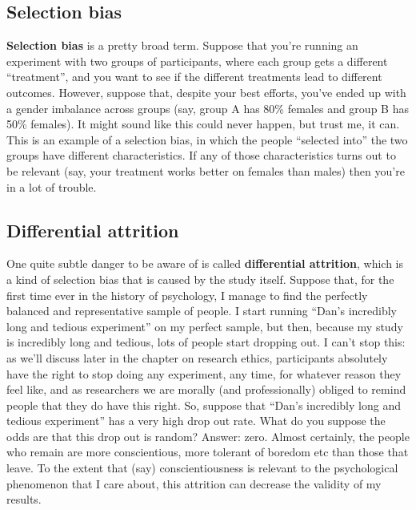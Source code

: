\documentclass[
]{book}
\begin{document}
\hypertarget{selection-bias}{%
\subsection{Selection bias}\label{selection-bias}}

\textbf{Selection bias} is a pretty broad term. Suppose that you're running an experiment with two groups of participants, where each group gets a different ``treatment'', and you want to see if the different treatments lead to different outcomes. However, suppose that, despite your best efforts, you've ended up with a gender imbalance across groups (say, group A has 80\% females and group B has 50\% females). It might sound like this could never happen, but trust me, it can. This is an example of a selection bias, in which the people ``selected into'' the two groups have different characteristics. If any of those characteristics turns out to be relevant (say, your treatment works better on females than males) then you're in a lot of trouble.

\hypertarget{differential-attrition}{%
\subsection{Differential attrition}\label{differential-attrition}}

One quite subtle danger to be aware of is called \textbf{differential attrition}, which is a kind of selection bias that is caused by the study itself. Suppose that, for the first time ever in the history of psychology, I manage to find the perfectly balanced and representative sample of people. I start running ``Dan's incredibly long and tedious experiment'' on my perfect sample, but then, because my study is incredibly long and tedious, lots of people start dropping out. I can't stop this: as we'll discuss later in the chapter on research ethics, participants absolutely have the right to stop doing any experiment, any time, for whatever reason they feel like, and as researchers we are morally (and professionally) obliged to remind people that they do have this right. So, suppose that ``Dan's incredibly long and tedious experiment'' has a very high drop out rate. What do you suppose the odds are that this drop out is random? Answer: zero. Almost certainly, the people who remain are more conscientious, more tolerant of boredom etc than those that leave. To the extent that (say) conscientiousness is relevant to the psychological phenomenon that I care about, this attrition can decrease the validity of my results.
\end{document}
